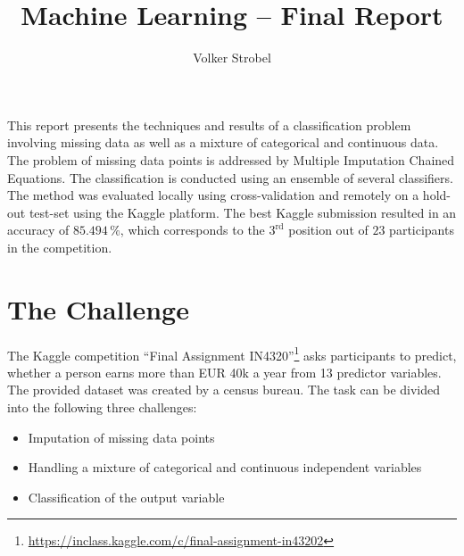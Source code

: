 \documentclass{article}
\renewenvironment{abstract}
  {{\bfseries\noindent{\large\abstractname}\par\nobreak}}
  {}
\begin{document}
\title{Machine Learning -- Final Report}


\author[ ]{Volker Strobel}

\affil[ ]{}
\vspace{-1em}


\date{}

\begingroup
\let\center\flushleft
\let\endcenter\endflushleft
\maketitle
\endgroup

\begin{abstract}
This report presents the techniques and results of a classification
  problem involving missing data as well as a mixture of categorical
  and continuous data. The problem of missing data points is
  addressed by Multiple Imputation Chained Equations. The
  classification is conducted using an ensemble of several classifiers. The
  method was evaluated locally using cross-validation and
  remotely on a hold-out test-set using the Kaggle platform. The best
  Kaggle submission resulted in an accuracy of $85.494\,\%$, which corresponds to
the $3^{\text{rd}}$ position out of $23$ participants in the competition.%
\end{abstract}%



\maketitle

\section{The Challenge}
\label{sec:introduction}

The Kaggle competition ``Final Assignment IN4320''\footnote{\url{https://inclass.kaggle.com/c/final-assignment-in43202}} asks participants to predict, whether a person earns more than EUR 40k a year from 13 predictor variables. The provided dataset was created by a census bureau. The task can be divided into the following three challenges:

\begin{itemize}
\item Imputation of missing data points
\item Handling a mixture of categorical and continuous independent variables
\item Classification of the output variable
\end{itemize}
\end{document}

